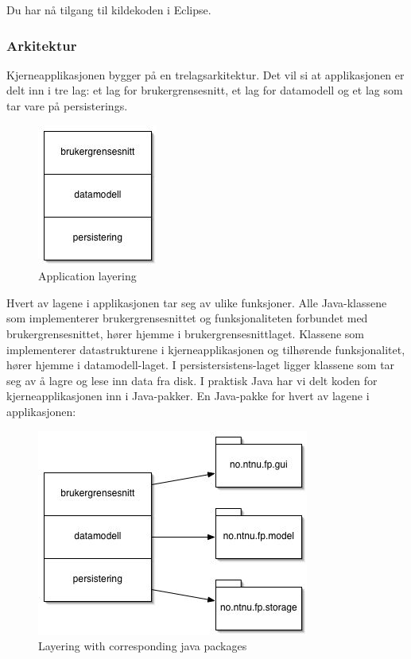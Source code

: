 Du har nå tilgang til kildekoden i Eclipse.

\subsubsection{Arkitektur}

Kjerneapplikasjonen bygger på en trelagsarkitektur. Det vil si at applikasjonen er delt inn i tre lag: et lag for brukergrensesnitt, et lag for datamodell og et lag som tar vare på persisterings.

\begin{figure}[H]
    \centering
    \includegraphics{resources/layering-application.jpg}
    \caption{Application layering}
    \label{fig:layering-application}
\end{figure}

Hvert av lagene i applikasjonen tar seg av ulike funksjoner. Alle Java-klassene som implementerer brukergrensesnittet og funksjonaliteten forbundet med brukergrensesnittet, hører hjemme i brukergrensesnittlaget. Klassene som implementerer datastrukturene i kjerneapplikasjonen og tilhørende funksjonalitet, hører hjemme i datamodell-laget. I persistersistens-laget ligger klassene som tar seg av å lagre og lese inn data fra disk. I praktisk Java har vi delt koden for kjerneapplikasjonen inn i Java-pakker. En Java-pakke for hvert av lagene i applikasjonen:

\begin{figure}[H]
    \centering
    \includegraphics[width=\textwidth]{resources/layering-corresponding-java-packets.jpg}
    \caption{Layering with corresponding java packages}
    \label{fig:layering-corresponding-java-packets}
\end{figure}

